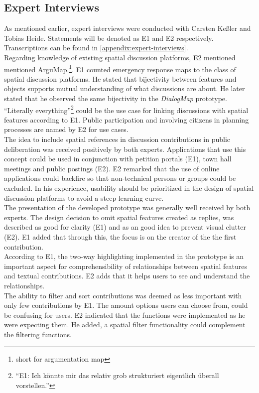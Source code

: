 \subsection{Expert Interviews}
\label{sub:ev_expert_interviews}
As mentioned earlier, expert interviews were conducted with Carsten Ke{\ss}ler and Tobias Heide. Statements will be denoted as E1 and E2 respectively. Transcriptions can be found in \ref{appendix:expert-interviews}.\\
Regarding knowledge of existing spatial discussion platforms, E2 mentioned mentioned ArguMap.\footnote{short for argumentation map}. E1 counted emergency response maps to the class of spatial discussion platforms. He stated that bijectivity between features and objects supports mutual understanding of what discussions are about. He later stated that he observed the same bijectivity in the \textit{DialogMap} prototype.\\
``Literally everything''\footnote{``E1: Ich k{\"o}nnte mir das relativ grob strukturiert eigentlich {\"u}berall vorstellen.''} could be the use case for linking discussions with spatial features according to E1. Public participation and involving citizens in planning processes are named by E2 for use cases.\\
The idea to include spatial references in discussion contributions in public deliberation was received positively by both experts. Applications that use this concept could be used in conjunction with petition portals (E1), town hall meetings and public postings (E2). E2 remarked that the use of online applications could backfire so that non-technical persons or groups could be excluded. In his experience, usability should be prioritized in the design of spatial discussion platforms to avoid a steep learning curve.\\
The presentation of the developed prototype was generally well received by both experts. The design decision to omit spatial features created as replies, was described as good for clarity (E1) and as an good idea to prevent visual clutter (E2). E1 added that through this, the focus is on the creator of the the first contribution.\\
According to E1, the two-way highlighting implemented in the prototype is an important aspect for comprehensibility of relationships between spatial features and textual contributions. E2 adds that it helps users to see and understand the relationships.\\
The ability to filter and sort contributions was deemed as less important with only few contributions by E1. The amount options users can choose from, could be confusing for users. E2 indicated that the functions were implemented as he were expecting them. He added, a spatial filter functionality could complement the filtering functions.\\
